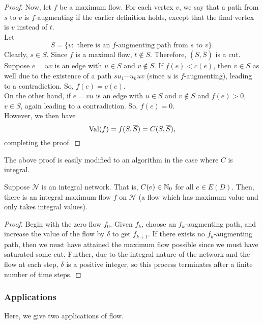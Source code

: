 \begin{proof}
				Now, let $f$ be a maximum flow. For each vertex $v$, we say that a path from $s$ to $v$ is $f$-augmenting if the earlier definition holds, except that the final vertex is $v$ instead of $t$.\\
				Let
				\[ S = \{ v: \text{ there is an $f$-augmenting path from $s$ to $v$} \}. \]
				Clearly, $s\in S$. Since $f$ is a maximal flow, $t\not\in S$. Therefore, $(S,\overline{S})$ is a cut.\\
				Suppose $e = uv$ is an edge with $u \in S$ and $v \not\in S$. If $f(e) < c(e)$, then $v\in S$ as well due to the existence of a path $s u_1 \cdots u_k u v$ (since $u$ is $f$-augmenting), leading to a contradiction. So, $f(e) = c(e)$.\\
				On the other hand, if $e = vu$ is an edge with $u \in S$ and $v \not\in S$ and $f(e) > 0$, $v \in S$, again leading to a contradiction. So, $f(e) = 0$.\\
				However, we then have
				\[ \operatorname{Val}(f) = f(S,\overline{S}) = C(S,\overline{S}), \]
				completing the proof.
			\end{proof}

			The above proof is easily modified to an algorithm in the case where $C$ is integral.

			\begin{fcor}
				\label{integral network integral maxflow}
				Suppose $\mathcal{N}$ is an integral network. That is, $C(e) \in \mathbb{N}_0$ for all $e \in E(D)$. Then, there is an integral maximum flow $f$ on $\mathcal{N}$ (a flow which has maximum value and only takes integral values).
			\end{fcor}
			\begin{proof}
				Begin with the zero flow $f_0$. Given $f_k$, choose an $f_k$-augmenting path, and increase the value of the flow by $\delta$ to get $f_{k+1}$. If there exists no $f_k$-augmenting path, then we must have attained the maximum flow possible since we must have saturated some cut. Further, due to the integral nature of the network and the flow at each step, $\delta$ is a positive integer, so this process terminates after a finite number of time steps.
			\end{proof}

		\subsubsection{Applications}

			Here, we give two applications of flow.\\

